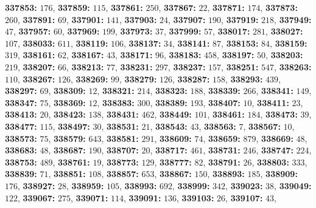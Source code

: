 \textsf{\bfseries 337853:} $176$, \textsf{\bfseries 337859:} $115$, \textsf{\bfseries 337861:} $250$, \textsf{\bfseries 337867:} $22$, \textsf{\bfseries 337871:} $174$, \textsf{\bfseries 337873:} $260$, \textsf{\bfseries 337891:} $69$, \textsf{\bfseries 337901:} $141$, \textsf{\bfseries 337903:} $24$, \textsf{\bfseries 337907:} $190$, \textsf{\bfseries 337919:} $218$, \textsf{\bfseries 337949:} $47$, \textsf{\bfseries 337957:} $60$, \textsf{\bfseries 337969:} $199$, \textsf{\bfseries 337973:} $37$, \textsf{\bfseries 337999:} $57$, \textsf{\bfseries 338017:} $281$, \textsf{\bfseries 338027:} $107$, \textsf{\bfseries 338033:} $611$, \textsf{\bfseries 338119:} $106$, \textsf{\bfseries 338137:} $34$, \textsf{\bfseries 338141:} $87$, \textsf{\bfseries 338153:} $84$, \textsf{\bfseries 338159:} $319$, \textsf{\bfseries 338161:} $62$, \textsf{\bfseries 338167:} $43$, \textsf{\bfseries 338171:} $96$, \textsf{\bfseries 338183:} $458$, \textsf{\bfseries 338197:} $50$, \textsf{\bfseries 338203:} $219$, \textsf{\bfseries 338207:} $66$, \textsf{\bfseries 338213:} $77$, \textsf{\bfseries 338231:} $297$, \textsf{\bfseries 338237:} $157$, \textsf{\bfseries 338251:} $547$, \textsf{\bfseries 338263:} $110$, \textsf{\bfseries 338267:} $126$, \textsf{\bfseries 338269:} $99$, \textsf{\bfseries 338279:} $126$, \textsf{\bfseries 338287:} $158$, \textsf{\bfseries 338293:} $439$, \textsf{\bfseries 338297:} $69$, \textsf{\bfseries 338309:} $12$, \textsf{\bfseries 338321:} $214$, \textsf{\bfseries 338323:} $188$, \textsf{\bfseries 338339:} $266$, \textsf{\bfseries 338341:} $149$, \textsf{\bfseries 338347:} $75$, \textsf{\bfseries 338369:} $12$, \textsf{\bfseries 338383:} $300$, \textsf{\bfseries 338389:} $193$, \textsf{\bfseries 338407:} $10$, \textsf{\bfseries 338411:} $23$, \textsf{\bfseries 338413:} $20$, \textsf{\bfseries 338423:} $138$, \textsf{\bfseries 338431:} $462$, \textsf{\bfseries 338449:} $101$, \textsf{\bfseries 338461:} $184$, \textsf{\bfseries 338473:} $39$, \textsf{\bfseries 338477:} $115$, \textsf{\bfseries 338497:} $30$, \textsf{\bfseries 338531:} $21$, \textsf{\bfseries 338543:} $43$, \textsf{\bfseries 338563:} $7$, \textsf{\bfseries 338567:} $10$, \textsf{\bfseries 338573:} $75$, \textsf{\bfseries 338579:} $643$, \textsf{\bfseries 338581:} $291$, \textsf{\bfseries 338609:} $74$, \textsf{\bfseries 338659:} $879$, \textsf{\bfseries 338669:} $48$, \textsf{\bfseries 338683:} $48$, \textsf{\bfseries 338687:} $190$, \textsf{\bfseries 338707:} $20$, \textsf{\bfseries 338717:} $461$, \textsf{\bfseries 338731:} $246$, \textsf{\bfseries 338747:} $224$, \textsf{\bfseries 338753:} $489$, \textsf{\bfseries 338761:} $19$, \textsf{\bfseries 338773:} $129$, \textsf{\bfseries 338777:} $82$, \textsf{\bfseries 338791:} $26$, \textsf{\bfseries 338803:} $333$, \textsf{\bfseries 338839:} $71$, \textsf{\bfseries 338851:} $108$, \textsf{\bfseries 338857:} $653$, \textsf{\bfseries 338867:} $150$, \textsf{\bfseries 338893:} $185$, \textsf{\bfseries 338909:} $176$, \textsf{\bfseries 338927:} $28$, \textsf{\bfseries 338959:} $105$, \textsf{\bfseries 338993:} $692$, \textsf{\bfseries 338999:} $342$, \textsf{\bfseries 339023:} $38$, \textsf{\bfseries 339049:} $122$, \textsf{\bfseries 339067:} $275$, \textsf{\bfseries 339071:} $114$, \textsf{\bfseries 339091:} $136$, \textsf{\bfseries 339103:} $26$, \textsf{\bfseries 339107:} $43$, 
